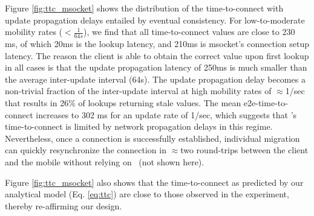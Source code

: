 Figure \ref{fig:ttc_msocket} shows the distribution of the time-to-connect with update propagation delays entailed by eventual consistency. For low-to-moderate mobility rates ($<\frac{1}{64s}$), we find that all time-to-connect values are close to 230 ms, of which 20ms is the lookup latency, and 210ms is msocket's connection setup latency. The reason the client is able to obtain the correct value upon first lookup in all cases is that the update propagation latency of 250ms is much smaller than the average inter-update interval (64s).  The update propagation delay becomes a non-trivial fraction of the inter-update interval at high mobility rates of $\approx$1/sec that results in  26\% of lookups returning stale values. The mean e2e-time-to-connect increases to  302 ms for an update rate of 1/sec, which suggests that \auspice's time-to-connect is limited by network propagation delays in this regime. Nevertheless, once a connection is successfully established, {individual} migration can quickly resynchronize the connection in $\approx$two round-trips between the client and the mobile without relying on \auspice\ (not shown here). 

Figure \ref{fig:ttc_msocket} also shows that the time-to-connect as predicted by our analytical model (Eq. \ref{eq:ttc}) are close to those observed in the experiment, thereby re-affirming our design. 


